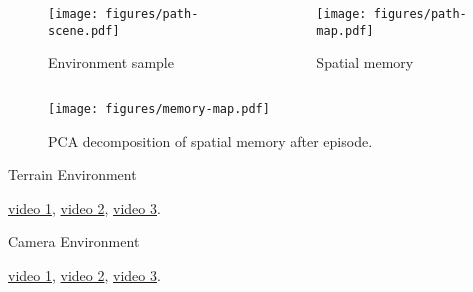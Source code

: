 \begin{frame}
    \begin{columns}
        \begin{column}{0.5\textwidth}
            \begin{figure}
                \centering
                \texttt{[image: figures/path-scene.pdf]}
                \par Environment sample
            \end{figure}
        \end{column}
        \begin{column}{0.5\textwidth}
            \begin{figure}
                \centering
                \texttt{[image: figures/path-map.pdf]}
                \par Spatial memory 
            \end{figure}
        \end{column}
    \end{columns}
\end{frame}

\begin{frame}
    \begin{figure}
        \centering
        \texttt{[image: figures/memory-map.pdf]}
        \par PCA decomposition of spatial memory after episode.
    \end{figure}
\end{frame}

\begin{frame}
    \begin{table}
        \centering
        Terrain Environment\par\vspace{0.5em}
        
    \end{table}

    \begin{center}
        \href{run:./videos/terrain/map/0.mp4}{video 1},
        \href{run:./videos/terrain/map/1.mp4}{video 2},
        \href{run:./videos/terrain/map/2.mp4}{video 3}.
    \end{center}
\end{frame}

\begin{frame}
    \begin{table}
        \centering
        Camera Environment\par\vspace{0.5em}
        
    \end{table}

    \begin{center}
        \href{run:./videos/camera/lstm/1.mp4}{video 1},
        \href{run:./videos/camera/lstm/500.mp4}{video 2},
        \href{run:./videos/camera/lstm/1000.mp4}{video 3}.
    \end{center}
\end{frame}

